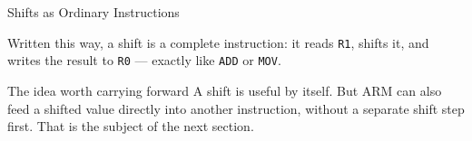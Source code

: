 \documentclass[9pt,aspectratio=169,xcolor=table]{beamer}
\begin{document}
\begin{frame}[fragile]{Shifts as Ordinary Instructions}
    \leavevmode

    \vspace{3mm}
    {\small Written this way, a shift is a complete instruction: it
    reads \texttt{R1}, shifts it, and writes the result to \texttt{R0}
    --- exactly like \texttt{ADD} or \texttt{MOV}.}

    \vspace{3mm}
    \begin{block}{The idea worth carrying forward}
        A shift is useful by itself. But ARM can also feed a shifted
        value \alert{directly into another instruction}, without a
        separate shift step first. That is the subject of the next
        section.
    \end{block}
\end{frame}
\end{document}
